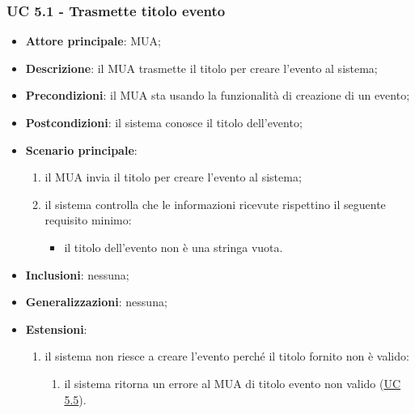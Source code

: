 \subsubsection{UC 5.1 - Trasmette titolo evento} \label{sec:UC5.1}
    \begin{itemize}
        \item \textbf{Attore principale}: MUA;
        \item \textbf{Descrizione}: il MUA trasmette il titolo per creare l'evento al sistema;
        \item \textbf{Precondizioni}: il MUA sta usando la funzionalità di creazione di un evento;
        \item \textbf{Postcondizioni}: il sistema conosce il titolo dell'evento;
        \item \textbf{Scenario principale}:
            \begin{enumerate}
                \item il MUA invia il titolo per creare l'evento al sistema;
                \item il sistema controlla che le informazioni ricevute rispettino il seguente requisito minimo:
                    \begin{itemize}
                        \item il titolo dell'evento non è una stringa vuota.
                    \end{itemize}
            \end{enumerate}
        \item \textbf{Inclusioni}: nessuna;
        \item \textbf{Generalizzazioni}: nessuna;
        \item \textbf{Estensioni}:
            \begin{enumerate}[label=\alph*.]
                \item il sistema non riesce a creare l'evento perché il titolo fornito non è valido:
                \begin{enumerate}[label=\arabic*.]
                    \item il sistema ritorna un errore al MUA di titolo evento non valido (\hyperref[sec:UC5.5]{UC 5.5}).
                \end{enumerate}
            \end{enumerate}
    \end{itemize}



